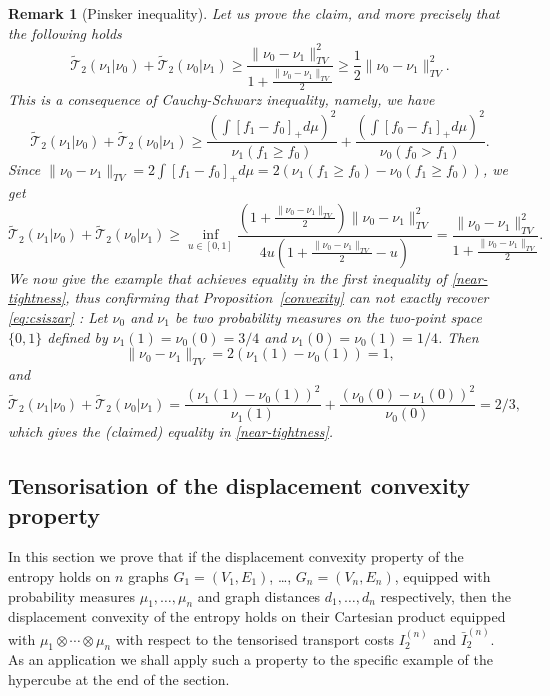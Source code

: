 \documentclass[11pt]{amsart}
\newtheorem{rem}[equation]{Remark}
\numberwithin{equation}{section}
\begin{document}
\begin{rem}[Pinsker inequality]
Let us prove the claim, and more precisely that the following holds
\begin{equation}\label{near-tightness}
{\widetilde{\mathcal{T}}}_2(\nu_1|\nu_0)+{\widetilde{\mathcal{T}}}_2(\nu_0|\nu_1) \geq \frac{\|\nu_0-\nu_1\|_{TV}^2}{1+\frac{\|\nu_0-\nu_1\|_{TV}}{2}} \geq\frac 12\|\nu_0-\nu_1\|_{TV}^2.
\end{equation}
This is a consequence of Cauchy-Schwarz inequality, namely, we have
$$
{\widetilde{\mathcal{T}}}_2(\nu_1|\nu_0)+{\widetilde{\mathcal{T}}}_2(\nu_0|\nu_1) 
\geq 
\frac{\left(\int [f_1-f_0]_+ d\mu\right)^2}{\nu_1(f_1\geq f_0)}+\frac{\left(\int [f_0-f_1]_+ d\mu\right)^2}{\nu_0(f_0> f_1)}.
$$
Since  $ \|\nu_0-\nu_1\|_{TV}= 2\int [f_1-f_0]_+ d\mu= 2(\nu_1(f_1\geq f_0)-\nu_0(f_1\geq f_0))$, we get 
$$
{\widetilde{\mathcal{T}}}_2(\nu_1|\nu_0)+{\widetilde{\mathcal{T}}}_2(\nu_0|\nu_1)
\geq  
\inf_{u\in [0,1]}\frac{(1+\frac{\|\nu_0-\nu_1\|_{TV}}{2})\|\nu_0-\nu_1\|_{TV}^2}{4u(1+\frac{\|\nu_0-\nu_1\|_{TV}}{2}-u)}  
= 
\frac{\|\nu_0-\nu_1\|_{TV}^2}{1+\frac{\|\nu_0-\nu_1\|_{TV}}{2}} .
$$
We now give the example that achieves {\em equality} in the first inequality of \eqref{near-tightness}, thus confirming that Proposition~\ref{convexity} can not exactly recover \eqref{eq:csiszar} :
Let $\nu_0$ and $\nu_1$ be two probability measures on the two-point space $\{0,1\}$ defined by  $\nu_1(1)=\nu_0(0)=3/4$ and $\nu_1(0)=\nu_0(1)=1/4$. Then 
$$
 \|\nu_0-\nu_1\|_{TV}=2(\nu_1(1)-\nu_0(1))=1,
 $$
 and 
 $$
 {\widetilde{\mathcal{T}}}_2(\nu_1|\nu_0)+{\widetilde{\mathcal{T}}}_2(\nu_0|\nu_1)= \frac{(\nu_1(1)-\nu_0(1))^2}{\nu_1(1)}+\frac{(\nu_0(0)-\nu_1(0))^2}{\nu_0(0)}=2/3,
 $$
 which gives the (claimed) equality in \eqref{near-tightness}.
\end{rem}

\subsection{Tensorisation of the displacement convexity property}

In this section we prove that if the displacement convexity property of the entropy holds on $n$ graphs $G_1=(V_1,E_1)$, \ldots, $G_n=(V_n,E_n)$, equipped with probability measures $\mu_1,\ldots,\mu_n$ and graph distances $d_1,\ldots,d_n$ respectively, then the displacement convexity of the entropy holds on their Cartesian product equipped with $\mu_1\otimes\cdots\otimes\mu_n$ with respect to the tensorised transport costs $I_2^{(n)}$ and $\bar{I}_2^{(n)}$. As an application we shall apply such a property to the specific example of the hypercube at the end of the section. 
\end{document}
